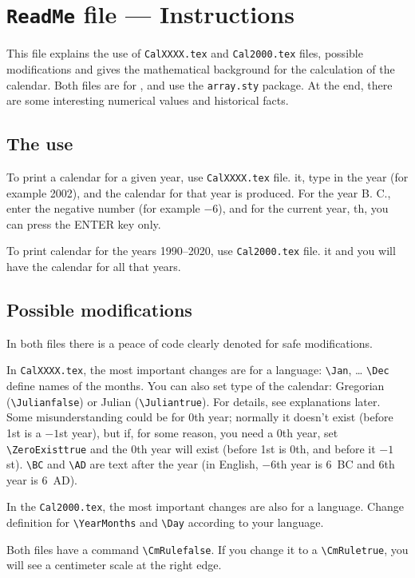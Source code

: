 \documentclass{article}
\begin{document}
\section*{\texttt{ReadMe} file --- Instructions}

This file explains the use of \verb|CalXXXX.tex| and \verb|Cal2000.tex| files, possible
modifications and gives the mathematical background for the calculation of the calendar. Both files
are for \LaTeXe, and use the \verb|array.sty| package. At the end, there are some interesting
numerical values and historical facts.

\subsection*{The use}

To print a calendar for a given year, use \verb|CalXXXX.tex| file. \LaTeXe it, type in the year
(for example 2002), and the calendar for that year is produced. For the year B. C., enter the
negative number (for example $-6$), and for the current year, \number\year th, you can press the
ENTER key only.

To print calendar for the years 1990--2020, use \verb|Cal2000.tex| file. \LaTeXe it and you will
have the calendar for all that years.

\subsection*{Possible modifications}

In both files there is a peace of code clearly denoted for safe modifications.

In \verb|CalXXXX.tex|, the most important changes are for a language: \verb|\Jan|, \dots
\verb|\Dec| define names of the months. You can also set type of the calendar: Gregorian
(\verb|\Julianfalse|) or Julian (\verb|\Juliantrue|). For details, see explanations later. Some
misunderstanding could be for 0th year; normally it doesn't exist (before 1st is a $-1$st year),
but if, for some reason, you need a 0th year, set \verb|\ZeroExisttrue| and the 0th year will exist
(before 1st is 0th, and before it $-1$st). \verb|\BC| and \verb|\AD| are text after the year (in
English, $-6$th year is 6~BC and 6th year is 6~AD).

In the \verb|Cal2000.tex|, the most important changes are also for a language. Change definition
for \verb|\YearMonths| and \verb|\Day| according to your language.

Both files have a command \verb|\CmRulefalse|. If you change it to a \verb|\CmRuletrue|, you will
see a centimeter scale at the right edge.
\end{document}
